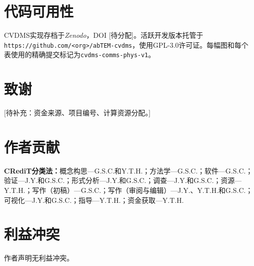 \documentclass[twoside,11pt]{ctexart}
\begin{document}
\section*{代码可用性}
CVDMS实现存档于\textit{Zenodo}，DOI [待分配]。活跃开发版本托管于{\tt https://github.com/<org>/abTEM-cvdms}，使用GPL-3.0许可证。每幅图和每个表使用的精确提交标记为{\tt cvdms-comms-phys-v1}。

\section*{致谢}
[待补充：资金来源、项目编号、计算资源分配。]

\section*{作者贡献}
\textbf{CRediT分类法：}概念构思---G.S.C.和Y.T.H.；方法学---G.S.C.；软件---G.S.C.；验证---J.Y.和G.S.C.；形式分析---J.Y.和G.S.C.；调查---J.Y.和G.S.C.；资源---Y.T.H.；写作（初稿）---G.S.C.；写作（审阅与编辑）---J.Y.、Y.T.H.和G.S.C.；可视化---J.Y.和G.S.C.；指导---Y.T.H.；资金获取---Y.T.H.

\section*{利益冲突}
作者声明无利益冲突。



\end{document}
